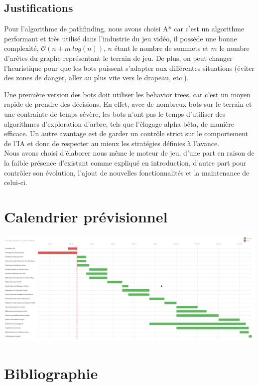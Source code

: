 \documentclass[french]{article}
\begin{document}
\subsection{Justifications}

Pour l'algorithme de pathfinding, nous avons choisi A* car c'est un algorithme performant et très utilisé dans l'industrie du jeu vidéo, il possède une bonne complexité, $\mathcal{O}(n + m\ log(n))$, $n$ étant le nombre de sommets et $m$ le nombre d'arêtes du graphe représentant le terrain de jeu. De plus, on peut changer l'heuristique pour que les bots puissent s'adapter aux différentes situations (éviter des zones de danger, aller au plus vite vers le drapeau, etc.). \newline

Une première version des bots doit utiliser les behavior trees, car c'est un moyen rapide de prendre des décisions. En effet, avec de nombreux bots sur le terrain et une contrainte de temps sévère, les bots n'ont pas le temps d'utiliser des algorithmes d'exploration d'arbre, tels que l'élagage alpha bêta, de manière efficace. Un autre avantage est de garder un contrôle strict sur le comportement de l'IA et donc de respecter au mieux les stratégies définies à l'avance.\\

Nous avons choisi d'élaborer nous même le moteur de jeu, d'une part en raison de la faible présence d'existant comme expliqué en introduction, d'autre part pour contrôler son évolution, l'ajout de nouvelles fonctionnalités et la maintenance de celui-ci.
\newline

\section{Calendrier prévisionnel}

\centerline{\includegraphics[scale=0.35]{data/gantt.png}}


\section{Bibliographie}

\printbibliography[heading=none]
\nocite{*}
\end{document}
